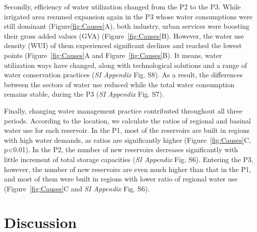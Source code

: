 \documentclass[9pt, twocolumn, twoside, lineno]{pnas-new}
\begin{document}
Secondly, efficiency of water utilization changed from the P2 to the P3.
While irrigated area resumed expansion again in the P3 whose water consumptions were still dominant (Figure\ref{fig:Causes}A), both industry, urban services were boosting their gross added values (GVA) (Figure~\ref{fig:Causes}B). 
However, the water use density (WUI) of them experienced significant declines and reached the lowest points (Figure~\ref{fig:Causes}A and Figure~\ref{fig:Causes}B).
It means, water utilization ways  have changed, along with technological solutions and a range of water conservation practices (\textit{SI Appendix} Fig. S8). As a result, the differences between the sectors of water use reduced while the total water consumption remains stable, during the P3 (\textit{SI Appendix} Fig. S7).

Finally, changing water management practice contributed throughout all three periods. 
According to the location, we calculate the ratios of regional and basinal water use for each reservoir.
In the P1, most of the reservoirs are built in regions with high water demands, as ratios are significantly higher (Figure~\ref{fig:Causes}C, p<0.01). 
In the P2, the number of new reservoirs decreases significantly with little increment of total storage capacities (\textit{SI Appendix} Fig. S6). 
Entering the P3, however, the number of new reservoirs are even much higher than that in the P1, and most of them were built in regions with lower ratio of regional water use (Figure~\ref{fig:Causes}C and \textit{SI Appendix} Fig. S6).

\section*{Discussion}
\label{Discussion}

\end{document}
